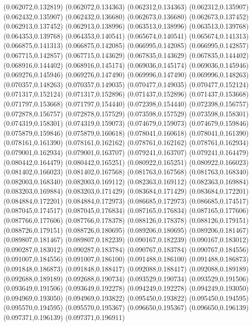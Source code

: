 (0.062072,0.132819)
(0.062072,0.134363)
(0.062312,0.134363)
(0.062312,0.135907)
(0.062432,0.135907)
(0.062432,0.136680)
(0.062673,0.136680)
(0.062673,0.137452)
(0.062913,0.137452)
(0.062913,0.138996)
(0.063513,0.138996)
(0.063513,0.139768)
(0.064353,0.139768)
(0.064353,0.140541)
(0.065674,0.140541)
(0.065674,0.141313)
(0.066875,0.141313)
(0.066875,0.142085)
(0.066995,0.142085)
(0.066995,0.142857)
(0.067715,0.142857)
(0.067715,0.143629)
(0.067835,0.143629)
(0.067835,0.144402)
(0.068916,0.144402)
(0.068916,0.145174)
(0.069036,0.145174)
(0.069036,0.145946)
(0.069276,0.145946)
(0.069276,0.147490)
(0.069996,0.147490)
(0.069996,0.148263)
(0.070357,0.148263)
(0.070357,0.149035)
(0.070477,0.149035)
(0.070477,0.152124)
(0.071317,0.152124)
(0.071317,0.152896)
(0.071437,0.152896)
(0.071437,0.153668)
(0.071797,0.153668)
(0.071797,0.154440)
(0.072398,0.154440)
(0.072398,0.156757)
(0.072878,0.156757)
(0.072878,0.157529)
(0.073598,0.157529)
(0.073598,0.158301)
(0.074319,0.158301)
(0.074319,0.159073)
(0.074679,0.159073)
(0.074679,0.159846)
(0.075879,0.159846)
(0.075879,0.160618)
(0.078041,0.160618)
(0.078041,0.161390)
(0.078161,0.161390)
(0.078161,0.162162)
(0.078761,0.162162)
(0.078761,0.162934)
(0.079001,0.162934)
(0.079001,0.163707)
(0.079241,0.163707)
(0.079241,0.164479)
(0.080442,0.164479)
(0.080442,0.165251)
(0.080922,0.165251)
(0.080922,0.166023)
(0.081402,0.166023)
(0.081402,0.167568)
(0.081763,0.167568)
(0.081763,0.168340)
(0.082003,0.168340)
(0.082003,0.169112)
(0.082363,0.169112)
(0.082363,0.169884)
(0.083203,0.169884)
(0.083203,0.171429)
(0.083684,0.171429)
(0.083684,0.172201)
(0.084884,0.172201)
(0.084884,0.172973)
(0.086685,0.172973)
(0.086685,0.174517)
(0.087045,0.174517)
(0.087045,0.176834)
(0.087165,0.176834)
(0.087165,0.177606)
(0.087766,0.177606)
(0.087766,0.178378)
(0.088126,0.178378)
(0.088126,0.179151)
(0.088726,0.179151)
(0.088726,0.180695)
(0.089206,0.180695)
(0.089206,0.181467)
(0.089807,0.181467)
(0.089807,0.182239)
(0.090167,0.182239)
(0.090167,0.183012)
(0.090287,0.183012)
(0.090287,0.183784)
(0.090767,0.183784)
(0.090767,0.184556)
(0.091007,0.184556)
(0.091007,0.186100)
(0.091488,0.186100)
(0.091488,0.186873)
(0.091848,0.186873)
(0.091848,0.188417)
(0.092088,0.188417)
(0.092088,0.189189)
(0.092688,0.189189)
(0.092688,0.190734)
(0.093529,0.190734)
(0.093529,0.191506)
(0.093649,0.191506)
(0.093649,0.192278)
(0.094249,0.192278)
(0.094249,0.193050)
(0.094969,0.193050)
(0.094969,0.193822)
(0.095450,0.193822)
(0.095450,0.194595)
(0.095570,0.194595)
(0.095570,0.195367)
(0.096650,0.195367)
(0.096650,0.196139)
(0.097371,0.196139)
(0.097371,0.196911)
